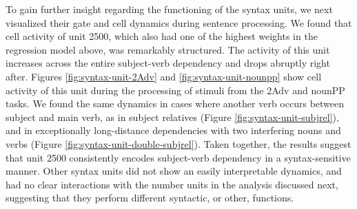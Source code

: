To gain further insight regarding the functioning of the syntax units,
we next visualized their gate and cell dynamics during sentence
processing. We found that cell activity of unit
\unit{2}{500}, which also had one of the highest weights in the
regression model above, was remarkably structured. The activity of
this unit increases across the entire subject-verb
dependency and drops abruptly right after. Figures
\ref{fig:syntax-unit-2Adv} and \ref{fig:syntax-unit-nounpp} show cell
activity of this unit during the processing of stimuli from the 2Adv
and nounPP tasks. We found the same dynamics in cases where another
verb occurs between subject and main verb, as in subject relatives
(Figure \ref{fig:syntax-unit-subjrel}), and in exceptionally
long-distance dependencies with two interfering nouns and verbs
(Figure \ref{fig:syntax-unit-double-subjrel}). Taken together, the
results suggest that unit \unit{2}{500} consistently encodes
subject-verb dependency in a syntax-sensitive manner. Other syntax
units did not show an easily interpretable dynamics, and had no clear
interactions with the number units in the analysis discussed next,
suggesting that they perform different syntactic, or other, functions.